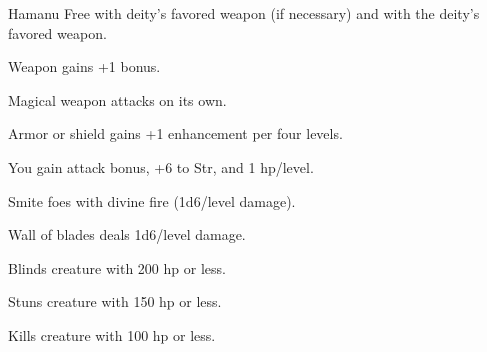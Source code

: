 {Hamanu}
{Free  with deity's favored weapon (if necessary) and  with the deity's favored weapon.}
{
	\item {} Weapon gains +1 bonus.
	\item {} Magical weapon attacks on its own.
	\item {} Armor or shield gains +1 enhancement per four levels.
	\item {} You gain attack bonus, +6 to Str, and 1 hp/level.
	\item {} Smite foes with divine fire (1d6/level damage).
	\item {} Wall of blades deals 1d6/level damage.
	\item {} Blinds creature with 200 hp or less.
	\item {} Stuns creature with 150 hp or less.
	\item {} Kills creature with 100 hp or less.
}
